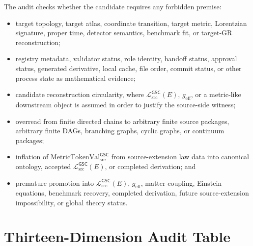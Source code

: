 \documentclass[11pt]{article}
\newcommand{\MetricTokenVal}{\mathrm{MetricTokenVal}_{\mathrm{src}}^{\mathsf{GSC}}}
\newcommand{\MetricData}{\mathcal{L}_{\mathrm{src}}^{\mathsf{GSC}}}
\newcommand{\geff}{g_{\mathrm{eff}}}
\begin{document}
The audit checks whether the candidate requires any forbidden premise:
\begin{itemize}[leftmargin=*]
  \item target topology, target atlas, coordinate transition, target metric,
  Lorentzian signature, proper time, detector semantics, benchmark fit, or
  target-GR reconstruction;
  \item registry metadata, validator status, role identity, handoff status,
  approval status, generated derivative, local cache, file order, commit
  status, or other process state as mathematical evidence;
  \item candidate reconstruction circularity, where \(\MetricData(E)\),
  \(\geff\), or a metric-like downstream object is assumed in order to
  justify the source-side witness;
  \item overread from finite directed chains to arbitrary finite source
  packages, arbitrary finite DAGs, branching graphs, cyclic graphs, or
  continuum packages;
  \item inflation of \(\MetricTokenVal\) from source-extension law data into
  canonical ontology, accepted \(\MetricData(E)\), or completed derivation;
  and
  \item premature promotion into \(\MetricData(E)\), \(\geff\), matter
  coupling, Einstein equations, benchmark recovery, completed derivation,
  future source-extension impossibility, or global theory status.
\end{itemize}

\section{Thirteen-Dimension Audit Table}
\end{document}
